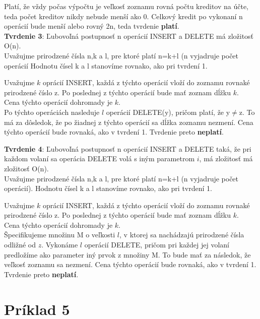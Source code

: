 \documentclass[paper=a4, fontsize=11pt]{scrartcl} %
\numberwithin{equation}{section} %
\numberwithin{figure}{section} %
\numberwithin{table}{section} %
\begin{document}
Platí, že vždy počas výpočtu je veľkosť zoznamu rovná počtu kreditov na účte, teda počet kreditov nikdy nebude menší ako 0.
Celkový kredit po vykonaní n operácií bude menší alebo rovný 2n, teda tvrdenie \textbf{platí}. \\


\textbf{Tvrdenie 3}: Ľubovoľná postupnosť n operácií INSERT a DELETE má zložitosť O(n). \\

Uvažujme prirodzené čísla n,k a l, pre ktoré platí n=k+l (n vyjadruje počet operácií
Hodnotu čísel k a l stanovíme rovnako, ako pri tvrdení 1.

Uvažujme $k$ oprácií INSERT, každá z týchto operácií vloží do zoznamu rovnaké prirodzené číslo z.
Po poslednej z týchto operácií bude mať zoznam dĺžku $k$. \\

Cena týchto operácií dohromady je $k$. \\

Po týchto operáciách nasleduje $l$ operácií DELETE(y), pričom platí, že y$\neq$z. To má za dôsledok, že po žiadnej z týchto operácií sa dĺžka zoznamu nezmení. Cena týchto operácií bude rovnaká, ako v tvrdení 1.
Tvrdenie preto \textbf{neplatí}.

\textbf{Tvrdenie 4}: Ľubovoľná postupnosť n operácií INSERT a DELETE taká, že pri každom volaní sa operácia DELETE volá s iným parametrom $i$, má zložitosť má zložitosť O(n). \\

Uvažujme prirodzené čísla n,k a l, pre ktoré platí n=k+l (n vyjadruje počet operácií).
Hodnotu čísel k a l stanovíme rovnako, ako pri tvrdení 1.

Uvažujme $k$ oprácií INSERT, každá z týchto operácií vloží do zoznamu rovnaké prirodzené číslo z.
Po poslednej z týchto operácií bude mať zoznam dĺžku $k$. \\

Cena týchto operácií dohromady je $k$. \\

Špecifikujeme množinu M o veľkosti $l$, v ktorej sa nachádzajú prirodzené čísla odližné od $z$.
Vykonáme $l$ operácií DELETE, pričom pri každej jej volaní predložíme ako parameter iný prvok z množiny M.
To bude mať za následok, že veľkosť zoznamu sa nezmení. Cena týchto operácií bude rovnaká, ako v tvrdení 1.
Tvrdenie preto \textbf{neplatí}.





\pagebreak

\section*{Príklad 5}
\end{document}
